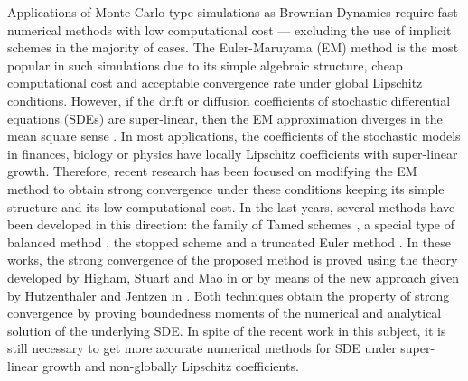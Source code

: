 	Applications of Monte Carlo type simulations \cite{Glasserman2004,Giles2008} as  Brownian Dynamics \cite{Cruz2012}
require  fast numerical methods with low computational cost --- excluding the use of 
implicit schemes in the majority of cases.
The Euler-Maruyama (EM) method is the most popular in such  
simulations due to its simple algebraic structure, cheap computational cost and acceptable convergence rate 
under global Lipschitz conditions. 
However, if the drift or diffusion coefficients of stochastic 
differential equations (SDEs) are super-linear, then the EM approximation 
diverges  in the mean square sense \cite{Hutzenthaler2009, Hutzenthaler2012b}. 
In most applications, the coefficients of the stochastic  models in finances, biology or physics 
have locally Lipschitz coefficients with super-linear growth. 
Therefore, recent research has been focused on modifying the EM method to obtain strong convergence  under these 
conditions keeping its simple structure and  its low computational cost. In the last years, 
several methods have been developed in this direction:  the family of  Tamed schemes
\cite{Hutzenthaler2012a, Wang2011, Zong2014,Hutzenthaler2015,Sabanis2015}, 
a special type of balanced method \cite{Tretyakov2013},  the stopped scheme \cite{Liu2013a} and 
a truncated Euler method  \cite{Mao2015}.
In these works, the strong convergence of the proposed method
is proved using the theory developed by Higham, Stuart and 
Mao in \cite{Higham2002b} or by means of  the new approach given by  Hutzenthaler and Jentzen in \cite{Hutzenthaler2015}.
Both techniques obtain the property of  strong convergence by proving boundedness moments of the numerical and 
analytical solution of the underlying SDE. In spite of the recent work in this subject,  it is still necessary
to get more accurate numerical methods for SDE under super-linear growth and 
non-globally Lipschitz coefficients.

